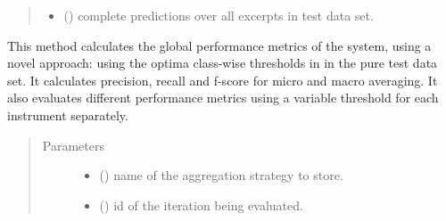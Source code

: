 \documentclass[letterpaper,10pt,english]{sphinxmanual}
\begin{document}
\begin{fulllineitems}
\begin{fulllineitems}
\begin{quote}
\begin{description}
\begin{itemize}
\item {} 
 () \textendash{} complete predictions over all excerpts in test data set.

\end{itemize}

\end{description}\end{quote}

\end{fulllineitems}


\begin{fulllineitems}
\label{\detokenize{evaluate:evaluate.Evaluator.best_classwise_global_performance_metrics}}
This method calculates the global performance metrics of the system, 
using a novel approach: using the optima class-wise thresholds in
in the pure test data set. It calculates precision, recall and f-score for micro and macro averaging.
It also evaluates different performance metrics using a variable threshold 
for each instrument separately.
\begin{quote}\begin{description}
\item[{Parameters}] \leavevmode\begin{itemize}
\item {} 
 () \textendash{} name of the aggregation strategy to store.

\item {} 
 () \textendash{} id of the iteration being evaluated.

\end{itemize}

\end{description}\end{quote}

\end{fulllineitems}



\end{fulllineitems}
\end{document}
